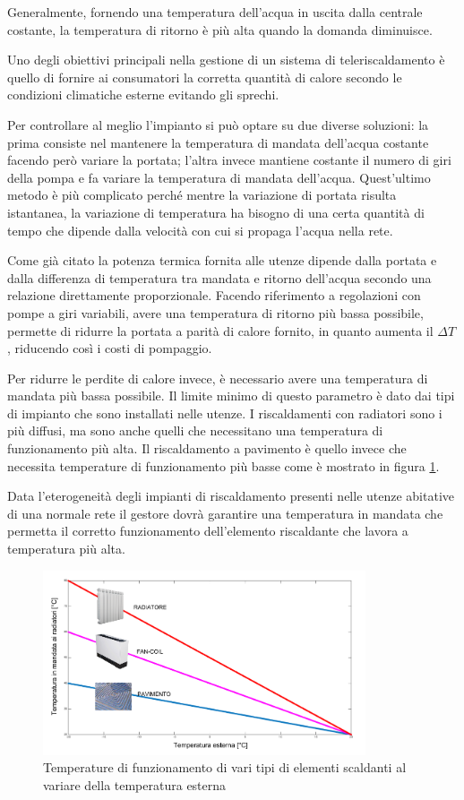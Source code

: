 \documentclass[laurea,oneside,11pt]{USiena_tesiLM}
\begin{document}
Generalmente, fornendo una temperatura dell'acqua in uscita dalla centrale costante, la temperatura di ritorno è più alta quando la domanda diminuisce.

Uno degli obiettivi principali nella gestione di un sistema di teleriscaldamento è quello  di fornire ai consumatori la corretta quantità di calore secondo le condizioni climatiche esterne evitando gli sprechi.

Per controllare al meglio l'impianto si può optare su due diverse soluzioni: la prima consiste nel mantenere la temperatura di mandata dell'acqua costante facendo però variare la portata; l'altra invece mantiene costante il numero di giri della pompa e fa variare la temperatura di mandata dell'acqua. Quest'ultimo metodo è più complicato perché mentre la variazione di portata risulta istantanea, la variazione di temperatura ha bisogno di una certa quantità di tempo  che dipende dalla velocità con cui si propaga l'acqua nella rete.

Come già citato la potenza termica fornita alle utenze dipende dalla portata e dalla differenza di temperatura tra mandata e ritorno dell'acqua secondo una relazione direttamente proporzionale. Facendo riferimento a regolazioni con pompe a giri variabili, avere una temperatura di ritorno più bassa possibile, permette di ridurre la portata a parità di calore fornito, in quanto aumenta il $\Delta T$, riducendo così i costi di pompaggio.

Per ridurre le perdite di calore invece, è necessario avere una temperatura di mandata più bassa possibile. Il limite minimo di questo parametro è dato dai tipi di impianto che sono installati nelle utenze. I riscaldamenti con radiatori sono i più diffusi, ma sono anche quelli che necessitano una temperatura di funzionamento più alta. Il riscaldamento a pavimento è quello invece che necessita temperature di funzionamento più basse come è mostrato in figura \ref{fig:elem_scaldanti}. 

Data l'eterogeneità degli impianti di riscaldamento presenti nelle utenze abitative di una normale rete il gestore dovrà garantire una temperatura in mandata che permetta il corretto funzionamento dell'elemento riscaldante che lavora a temperatura più alta.

\begin{figure}[!ht]
\centering
\includegraphics[width=0.85\textwidth]{figure/elem_scaldanti} 
\caption{Temperature di funzionamento di vari tipi di elementi scaldanti al variare della temperatura esterna}
\label{fig:elem_scaldanti}
\end{figure}
\end{document}
